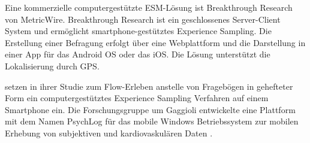 Eine kommerzielle computergestützte \ac{ESM}-Lösung ist Breakthrough Research von MetricWire. Breakthrough Research ist ein geschlossenes Server-Client System und ermöglicht smartphone-gestütztes Experience Sampling. Die Erstellung einer Befragung erfolgt über eine Webplattform und die Darstellung in einer App für das Android OS oder das iOS. Die Lösung unterstützt die Lokalisierung durch \ac{GPS}.

\citet{Gaggioli2013} setzen in ihrer Studie zum Flow-Erleben anstelle von Fragebögen in gehefteter Form ein computergestütztes Experience Sampling Verfahren auf einem Smartphone ein. Die Forschungsgruppe um Gaggioli entwickelte eine Plattform mit dem Namen PsychLog für das mobile Windows Betriebssystem zur mobilen Erhebung von subjektiven und kardiovaskulären Daten \citep{Gaggioli2013a}.






